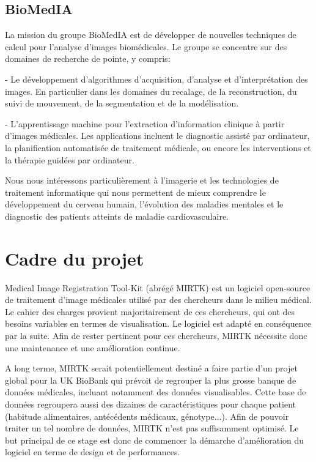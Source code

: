 \documentclass[10pt]{report}
\begin{document}
	
	\subsection{BioMedIA}
	
	La mission du groupe BioMedIA est de développer de nouvelles techniques de
	calcul pour l'analyse d'images biomédicales. Le groupe se concentre sur des
	domaines de recherche de pointe, y compris:

	- Le développement d'algorithmes d'acquisition, d'analyse et d'interprétation
	des images. En particulier dans les domaines du recalage, de la reconstruction,
	du suivi de mouvement, de la segmentation et de la modélisation.

	- L'apprentissage machine pour l'extraction d'information clinique à partir
	d'images médicales. Les applications incluent le diagnostic assisté par
	ordinateur, la planification automatisée de traitement médicale, ou encore les
	interventions et la thérapie guidées par ordinateur.

	Nous nous intéressons particulièrement à l'imagerie et les technologies de
	traitement informatique qui nous permettent de mieux comprendre le
	développement du cerveau humain, l’évolution des maladies mentales et le
	diagnostic des patients atteints de maladie cardiovasculaire.
	
	
	\section{Cadre du projet} %
	Medical Image Registration Tool-Kit (abrégé MIRTK) est un logiciel open-source de traitement d'image médicales utilisé par des chercheurs dans le milieu médical. Le cahier des charges provient majoritairement de ces chercheurs, qui ont des besoins variables en termes de visualisation. Le logiciel est adapté en conséquence par la suite.
	Afin de rester pertinent pour ces chercheurs, MIRTK nécessite donc une maintenance et une amélioration continue. 
	 
	 A long terme, MIRTK serait potentiellement destiné a faire partie d'un projet global pour la UK BioBank qui prévoit de regrouper la plus grosse banque de données médicales, incluant notamment des données visualisables. Cette base de données regroupera aussi des dizaines de caractéristiques pour chaque patient (habitude alimentaires, antécédents médicaux, génotype...). Afin de pouvoir traiter un tel nombre de données, MIRTK n'est pas suffisamment optimisé. Le but principal de ce stage est donc de commencer la démarche d'amélioration du logiciel en terme de design et de performances.
	 
\end{document}
